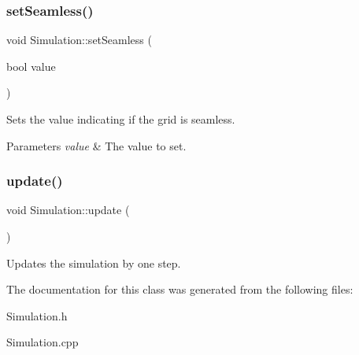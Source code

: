 \subsubsection{\texorpdfstring{setSeamless()}{setSeamless()}}
{\footnotesize\ttfamily void Simulation\+::set\+Seamless (\begin{DoxyParamCaption}\item[{bool}]{value }\end{DoxyParamCaption})}



Sets the value indicating if the grid is seamless. 


\begin{DoxyParams}{Parameters}
{\em value} & The value to set.\\
\hline
\end{DoxyParams}
\mbox{\label{class_simulation_a05f768b6836615170f1c43c6c0787fe8}} 
\subsubsection{\texorpdfstring{update()}{update()}}
{\footnotesize\ttfamily void Simulation\+::update (\begin{DoxyParamCaption}{ }\end{DoxyParamCaption})}



Updates the simulation by one step. 



The documentation for this class was generated from the following files\+:\begin{DoxyCompactItemize}
\item 
Simulation.\+h\item 
Simulation.\+cpp\end{DoxyCompactItemize}
